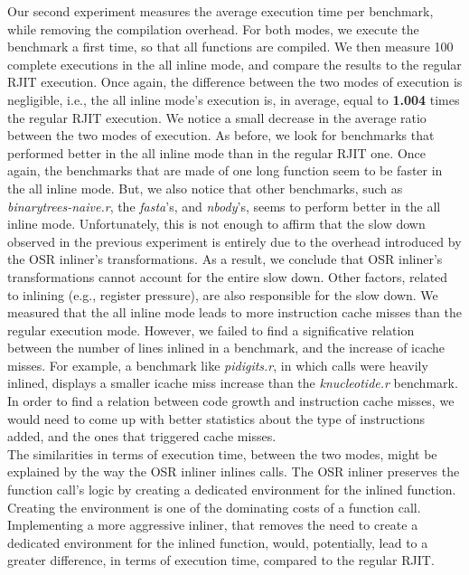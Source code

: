 Our second experiment measures the average execution time per benchmark, while removing the compilation overhead.
For both modes, we execute the benchmark a first time, so that all functions are compiled. 
We then measure 100 complete executions in the all inline mode, and compare the results to the regular RJIT execution.
Once again, the difference between the two modes of execution is negligible, i.e., the all inline mode's execution is, in average, equal to \textbf{1.004} times the regular RJIT execution.
We notice a small decrease in the average ratio between the two modes of execution.
As before, we look for benchmarks that performed better in the all inline mode than in the regular RJIT one.
Once again, the benchmarks that are made of one long function seem to be faster in the all inline mode.
But, we also notice that other benchmarks, such as \textit{binarytrees-naive.r}, the \textit{fasta}'s, and \textit{nbody}'s, seems to perform better in the all inline mode.
Unfortunately, this is not enough to affirm that the slow down observed in the previous experiment is entirely due to the overhead introduced by the OSR inliner's transformations.
As a result, we conclude that OSR inliner's transformations cannot account for the entire slow down.
Other factors, related to inlining (e.g., register pressure), are also responsible for the slow down.
We measured that the all inline mode leads to more instruction cache misses than the regular execution mode.
However, we failed to find a significative relation between the number of lines inlined in a benchmark, and the increase of icache misses.
For example, a benchmark like \textit{pidigits.r}, in which calls were heavily inlined, displays a smaller icache miss increase than the \textit{knucleotide.r} benchmark.
In order to find a relation between code growth and instruction cache misses, we would need to come up with better statistics about the type of instructions added, and the ones that triggered cache misses.\\

The similarities in terms of execution time, between the two modes, might be explained by the way the OSR inliner inlines calls.
The OSR inliner preserves the function call's logic by creating a dedicated environment for the inlined function.
Creating the environment is one of the dominating costs of a function call.
Implementing a more aggressive inliner, that removes the need to create a dedicated environment for the inlined function, would, potentially, lead to a greater difference, in terms of execution time, compared to the regular RJIT.\\

